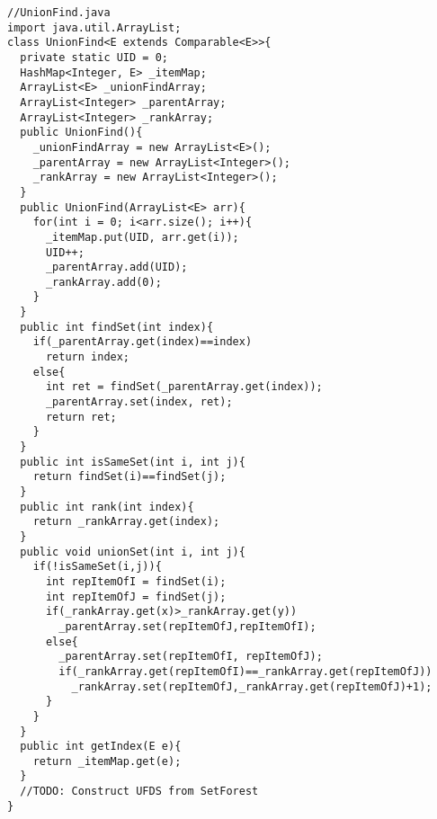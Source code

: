 \documentclass[11pt]{article}
\theoremstyle{definition}
\begin{document}
\begin{verbatim}
//UnionFind.java
import java.util.ArrayList;
class UnionFind<E extends Comparable<E>>{
  private static UID = 0;
  HashMap<Integer, E> _itemMap; 
  ArrayList<E> _unionFindArray;
  ArrayList<Integer> _parentArray;
  ArrayList<Integer> _rankArray;
  public UnionFind(){
    _unionFindArray = new ArrayList<E>();
    _parentArray = new ArrayList<Integer>();
    _rankArray = new ArrayList<Integer>();
  }
  public UnionFind(ArrayList<E> arr){
    for(int i = 0; i<arr.size(); i++){
      _itemMap.put(UID, arr.get(i));
      UID++;
      _parentArray.add(UID);
      _rankArray.add(0);
    }
  }
  public int findSet(int index){
    if(_parentArray.get(index)==index)
      return index;
    else{
      int ret = findSet(_parentArray.get(index));
      _parentArray.set(index, ret);
      return ret;
    }
  }
  public int isSameSet(int i, int j){
    return findSet(i)==findSet(j);
  }
  public int rank(int index){
    return _rankArray.get(index);
  }
  public void unionSet(int i, int j){
    if(!isSameSet(i,j)){
      int repItemOfI = findSet(i);
      int repItemOfJ = findSet(j);
      if(_rankArray.get(x)>_rankArray.get(y))
        _parentArray.set(repItemOfJ,repItemOfI);
      else{
        _parentArray.set(repItemOfI, repItemOfJ);
        if(_rankArray.get(repItemOfI)==_rankArray.get(repItemOfJ))
          _rankArray.set(repItemOfJ,_rankArray.get(repItemOfJ)+1);
      }
    }
  }
  public int getIndex(E e){
    return _itemMap.get(e);
  }
  //TODO: Construct UFDS from SetForest
}
\end{verbatim}
\clearpage
\end{document}
